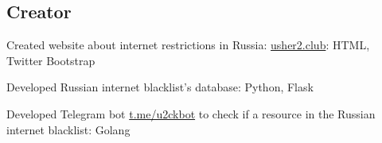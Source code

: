 \documentclass[letter,10pt]{article}
\begin{document}
\subsection{{Creator}}
\begin{zitemize}
\item Created website about internet restrictions in Russia: \href{https://usher2.club}{usher2.club}: HTML, Twitter Bootstrap
\item Developed Russian internet blacklist's database: Python, Flask
\item Developed Telegram bot \href{https://t.me/u2ckbot}{t.me/u2ckbot} to check if a resource in the Russian internet blacklist: Golang
\end{zitemize}
\end{document}
